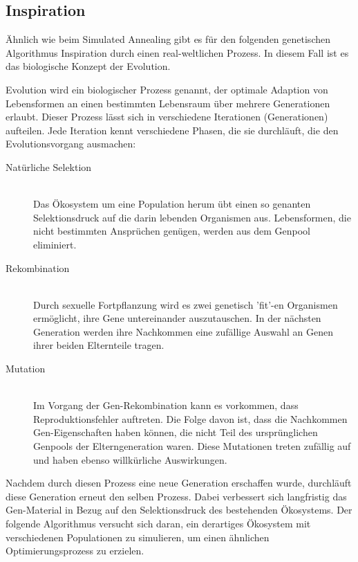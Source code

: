 \documentclass[runningheads,a4paper]{llncs}
\begin{document}
\subsection{Inspiration}

Ähnlich wie beim Simulated Annealing gibt es für den folgenden genetischen Algorithmus Inspiration durch einen real-weltlichen Prozess. In diesem Fall ist es das biologische Konzept der Evolution.

Evolution wird ein biologischer Prozess genannt, der optimale Adaption von Lebensformen an einen bestimmten Lebensraum über mehrere Generationen erlaubt. Dieser Prozess lässt sich in verschiedene Iterationen (Generationen) aufteilen. Jede Iteration kennt verschiedene Phasen, die sie durchläuft, die den Evolutionsvorgang ausmachen:

\begin{description}
	\item[Natürliche Selektion] \hfill \\ Das Ökosystem um eine Population herum übt einen so genanten Selektionsdruck auf die darin lebenden Organismen aus. Lebensformen, die nicht bestimmten Ansprüchen genügen, werden aus dem Genpool eliminiert.

	\item[Rekombination] \hfill \\ Durch sexuelle Fortpflanzung wird es zwei genetisch 'fit'-en Organismen ermöglicht, ihre Gene untereinander auszutauschen. In der nächsten Generation werden ihre Nachkommen eine zufällige Auswahl an Genen ihrer beiden Elternteile tragen.

	\item[Mutation] \hfill \\ Im Vorgang der Gen-Rekombination kann es vorkommen, dass Reproduktionsfehler auftreten. Die Folge davon ist, dass die Nachkommen Gen-Eigenschaften haben können, die nicht Teil des ursprünglichen Genpools der Elterngeneration waren. Diese Mutationen treten zufällig auf und haben ebenso willkürliche Auswirkungen.
\end{description}

Nachdem durch diesen Prozess eine neue Generation erschaffen wurde, durchläuft diese Generation erneut den selben Prozess. Dabei verbessert sich langfristig das Gen-Material in Bezug auf den Selektionsdruck des bestehenden Ökosystems. Der folgende Algorithmus versucht sich daran,  ein derartiges Ökosystem mit verschiedenen Populationen zu simulieren, um einen ähnlichen Optimierungsprozess zu erzielen.
\end{document}
